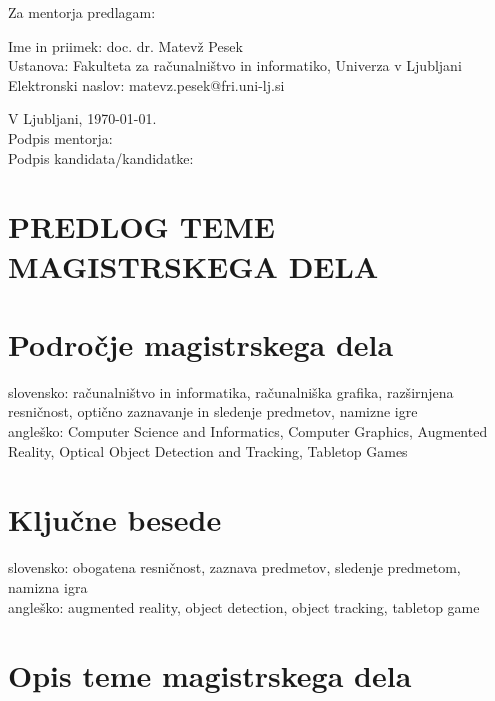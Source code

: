 \documentclass[a4paper, 12pt]{article}
\begin{document}
Za mentorja predlagam:

\hfill\begin{minipage}{\dimexpr\textwidth-2cm}
Ime in priimek: doc. dr. Matevž Pesek\\
Ustanova: Fakulteta za računalništvo in informatiko, Univerza v Ljubljani\\
Elektronski naslov: matevz.pesek@fri.uni-lj.si
\end{minipage}

\bigskip


\hfill V Ljubljani, \today. \\
%
\hfill Podpis mentorja: \hspace{180px} \\ Podpis kandidata/kandidatke:    

\clearpage
\section*{PREDLOG TEME MAGISTRSKEGA DELA}

\section{Področje magistrskega dela}

slovensko: računalništvo in informatika, računalniška grafika, razširnjena resničnost, optično zaznavanje in sledenje predmetov, namizne igre\\
angleško: Computer Science and Informatics, Computer Graphics, Augmented Reality, Optical Object Detection and Tracking, Tabletop Games


\section{Ključne besede}

slovensko: obogatena resničnost, zaznava predmetov, sledenje predmetom, namizna igra \\
angleško: augmented reality, object detection, object tracking, tabletop game


\section{Opis teme magistrskega dela}
\end{document}
